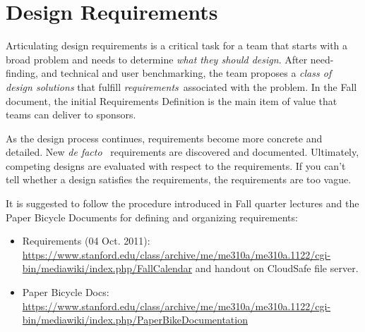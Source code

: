 \chapter{Design Requirements}
\label{sec-requirements}

\begin{remark} \color{blue}
Articulating design requirements is a critical task for a team that starts with a broad problem and needs to determine \emph{what they should design}. After need-finding, and technical and user benchmarking, the team proposes a {\em class of design solutions} that fulfill {\em requirements}\, associated with the problem. In the Fall document, the initial Requirements Definition is the main item of value that teams can deliver to sponsors.

As the design process continues, requirements become more concrete and detailed. New {\em de facto} \, requirements are discovered and documented. Ultimately, competing designs are evaluated with respect to the requirements. If you can't tell whether a design satisfies the requirements, the requirements are too vague.

It is suggested to follow the procedure introduced in Fall quarter lectures and the Paper Bicycle Documents for defining and organizing requirements:
\begin{itemize}\tightlist
\item Requirements (04 Oct. 2011): \url{https://www.stanford.edu/class/archive/me/me310a/me310a.1122/cgi-bin/mediawiki/index.php/FallCalendar} and handout on CloudSafe file server.
\item Paper Bicycle Docs: \url{https://www.stanford.edu/class/archive/me/me310a/me310a.1122/cgi-bin/mediawiki/index.php/PaperBikeDocumentation}
\end{itemize}
\normalcolor \end{remark}

